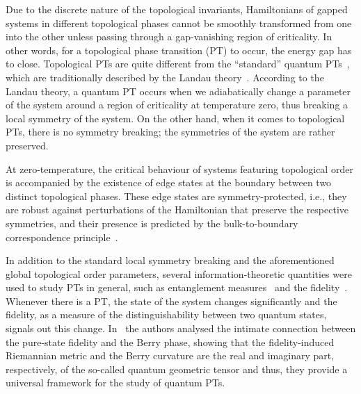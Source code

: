 Due to the discrete nature of the topological invariants, Hamiltonians of gapped systems in different topological phases cannot be smoothly transformed from one into the other unless passing through a gap-vanishing region of criticality. In other words, for a topological phase transition (PT) to occur, the energy gap has to close. Topological PTs are quite different from the ``standard'' quantum PTs~\cite{sac:07}, which are traditionally described by the Landau theory~\cite{lan:37}. According to the Landau theory, a quantum PT occurs when we adiabatically change a parameter of the system around a region of criticality at temperature zero, thus breaking a local symmetry of the system. On the other hand, when it comes to topological PTs, there is no symmetry breaking; the symmetries of the system are rather preserved.
  
 
At zero-temperature, the critical behaviour of systems featuring topological order is accompanied by the existence of edge states at the boundary between two distinct topological phases. These edge states are symmetry-protected, i.e., they are robust against perturbations of the Hamiltonian that preserve the respective symmetries, and their presence is predicted by the bulk-to-boundary correspondence principle~\cite{x:g:wen:91,ryu:hat:02}. 


In addition to the standard local symmetry breaking and the aforementioned global topological order parameters, several information-theoretic quantities were used to study PTs in general, such as entanglement measures~\cite{vid:lat:ric:kit:03,ham:ion:zan:05,ham:zha:haa:lid:08,hal:ham:12} and the fidelity~\cite{aba:ham:zan:08,zan:pau:06,zan:ven:gio:07,zha:zho:09, oli:sac:14, pau:sac:nog:vie:dug,gu:kwo:nin:wen:lin:08,maz:ham:12}. Whenever there is a PT, the state of the system changes significantly and the fidelity, as a measure of the distinguishability between two quantum states, signals out this change. In~\cite{zan:gio:coz:07} the authors analysed the intimate connection between the pure-state fidelity and the Berry phase, showing that the fidelity-induced Riemannian metric and the Berry curvature are the real and imaginary part, respectively, of the so-called quantum geometric tensor and thus, they provide a universal framework for the study of quantum PTs.

